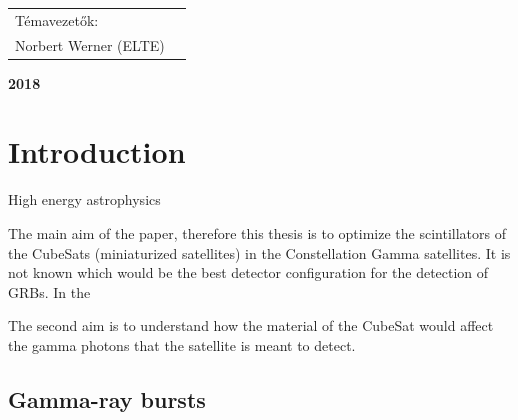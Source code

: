 \documentclass[12pt, a4paper,titlepage]{article}
\numberwithin{equation}{section}
\numberwithin{figure}{section}
\begin{document}
\begin{titlepage}
\begin{center}
\vspace{4 cm}
\end{center}

\begin{center}
\begin{tabular}{ll}
\centerline{ Témavezetők: } \\
\centerline{ Norbert Werner (ELTE)}
\end{tabular}
\end{center}
\begin{center}

\vspace{2.5 cm}
\large \textbf {2018}\\
\end{center}
\end{titlepage}
\tableofcontents
{}



\pagebreak
{}
\setcounter{page}{1}




\section{Introduction}

High energy astrophysics

The main aim of the paper, therefore this thesis is to optimize the scintillators of the CubeSats (miniaturized satellites) in the Constellation Gamma satellites. It is not known which would be the best detector configuration for the detection of GRBs. In the 


 The second aim is to understand how the material of the CubeSat would affect the gamma photons that the satellite is meant to detect.

\subsection{Gamma-ray bursts}
\end{document}
